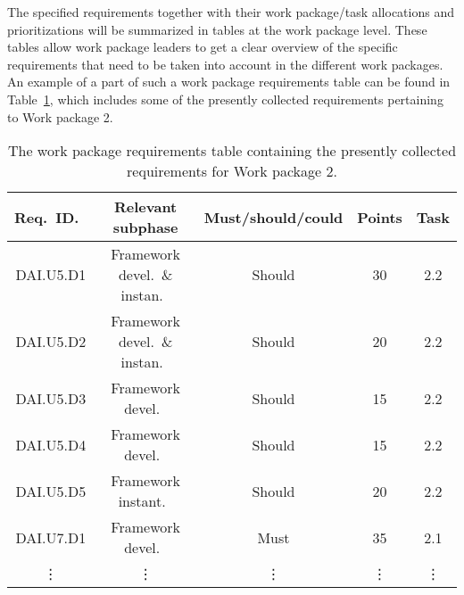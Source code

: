 
The specified requirements
 together
with their work package/task allocations and prioritizations will be summarized in
tables at the work package level. These tables allow work package leaders to get a clear overview of the specific
requirements that need to be taken into account in the different work packages. An example of a part of such a work
package requirements table can be found
in Table~\ref{tab:WP2-requirements}, which includes some of the presently collected requirements pertaining to Work package 2. 


\begin{table}[htbp]
  \centering
  \begin{tabular}{|c|c|c|c|c|}
    \hline
    Req.\ ID.\ & Relevant subphase & Must/should/could & Points & Task \\ \hline\hline
    DAI.U5.D1 & Framework devel.\ \& instan.\ & Should & 30 & 2.2  \\
    DAI.U5.D2 & Framework devel.\ \& instan.\ & Should & 20 & 2.2  \\
    DAI.U5.D3 & Framework devel.\ & Should & 15 & 2.2  \\
    DAI.U5.D4 & Framework devel.\ & Should & 15 & 2.2  \\
    DAI.U5.D5 & Framework instant.\ & Should & 20 & 2.2  \\
    DAI.U7.D1 & Framework devel.\ & Must & 35 & 2.1 \\
   \vdots & \vdots  & \vdots & \vdots & \vdots \\ \hline\hline
  \end{tabular}
  
  \caption{The work package requirements table containing the presently collected requirements for Work package 2.}
  \label{tab:WP2-requirements}
\end{table}



